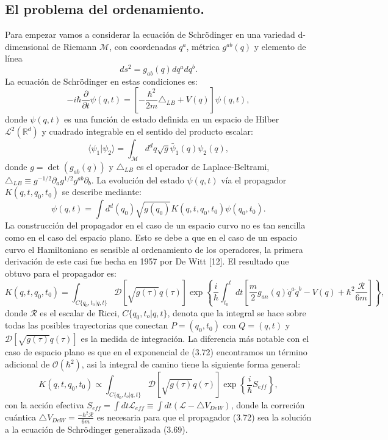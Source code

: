 \subsection{El problema del ordenamiento.}
Para empezar vamos a considerar la ecuación de Schrödinger en una variedad d-dimensional de Riemann $\mathcal{M}$, con coordenadas $q^a$, métrica $g^{ab}(q)$ y elemento de línea
\begin{equation}
ds^2=g_{ab}(q)dq^adq^b.
\end{equation}	
La ecuación de Schrödinger en estas condiciones es:
\begin{equation}
-i\hbar\frac{\partial}{\partial t}\psi(q,t)=\left[-\frac{\hbar^{2}}{2m}\triangle_{LB}+V(q)\right]\psi(q,t),
\end{equation}
donde $\psi(q,t)$ es una función de estado definida en un espacio de Hilber $\mathcal{L}^2(\mathbb{R}^d)$ y cuadrado integrable en el sentido del producto escalar:
\begin{equation}
\langle\psi_{1}|\psi_{2}\rangle=\int_{\mathcal{M}}d^{d}q\sqrt{g}\bar{\psi}_{1}(q)\psi_{2}(q),
\end{equation}
donde $g=\det (g_{ab}(q))$ y $\triangle_{LB}$ es el operador de Laplace-Beltrami, $\triangle_{LB}\equiv g^{-1/2}\partial_{a}g^{1/2}g^{ab}\partial_{b}$.
La evolución del estado $\psi(q,t)$ vía el propagador $K(q,t,q_0,t_0)$ se describe mediante:
\begin{equation}
\psi(q,t)=\int d^{d}(q_{0})\sqrt{g(q_{0})}K(q,t,q_{0},t_{0})\psi(q_{0},t_{0}).
\end{equation}
La construcción del propagador en el caso de un espacio curvo no es tan sencilla como en el caso del espacio plano. Esto se debe a que en el caso de un espacio curvo el Hamiltoniano es sensible al ordenamiento de los operadores, la primera derivación de este casi fue hecha en 1957 por De Witt [12]. El resultado que obtuvo para el propagador es:
\begin{equation}
K(q,t,q_{0},t_{0})=\int_{C\{q_{0},t_{o}|q,t\}}\mathcal{D}[\sqrt{g(\tau)}q(\tau)]\exp\left\{ \frac{i}{\hbar}\int_{t_{0}}^{t}dt\left[\frac{m}{2}g_{an}(q)\dot{q}^{a}\dot{q}^{b}-V(q)+\hbar^{2}\frac{\mathcal{R}}{6m}\right]\right\}, 
\end{equation}
donde $\mathcal{R}$ es el escalar de Ricci, ${C\{q_{0},t_{o}|q,t\}}$, denota que la integral se hace sobre todas las posibles trayectorias que conectan $P=(q_0,t_0)$ con $Q=(q,t)$ y $\mathcal{D}[\sqrt{g(\tau)}q(\tau)]$ es la medida de integración. La diferencia más notable con el caso de espacio plano es que en el exponencial de (3.72) encontramos un término adicional de $\mathcal{O}(\hbar^2)$, asi la integral de camino tiene la siguiente forma general:
\begin{equation}
K(q,t,q_{0},t_{0})\propto\int_{C\{q_{0},t_{o}|q,t\}}\mathcal{D}[\sqrt{g(\tau)}q(\tau)]\exp\left\{ \frac{i}{\hbar}S_{eff}\right\} ,
\end{equation}
con la acción efectiva $S_{eff}=\int dt\mathcal{L}_{eff}\equiv\int dt(\mathcal{L}-\triangle V_{DeW})$, donde la correción cuántica $\triangle V_{DeW}=\frac{-\hbar^2\mathcal{R}}{6m}$ es necesaria para que el propagador (3.72) sea la solución a la ecuación de Schrödinger generalizada (3.69).

